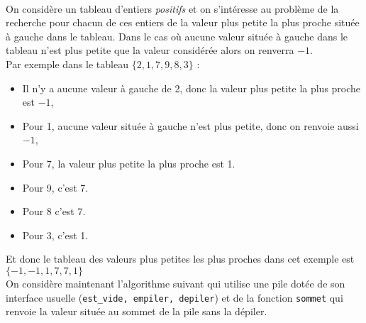 \documentclass[11pt,a4paper]{article}
\begin{document}
\begin{Exercise}[title = {Valeur plus petite la plus proche}]\\
On considère un tableau d'entiers \textit{positifs} et on s'intéresse au problème de la recherche pour chacun de ces entiers de la valeur plus petite la plus proche  située à gauche dans le tableau. Dans le cas où aucune valeur située à gauche dans le tableau n'est plus petite que la valeur considérée alors on  renverra $-1$.\\
Par exemple dans le tableau $\{2, 1, 7, 9, 8, 3\}$ :
\begin{itemize}
	\item Il n'y a aucune valeur à gauche de 2, donc la valeur plus petite la plus proche est $-1$,
	\item Pour 1, aucune valeur située à gauche n'est plus petite, donc on renvoie aussi $-1$,
	\item Pour 7, la valeur plus petite la plus proche est 1.
	\item Pour 9, c'est 7.
	\item Pour 8 c'est 7.
	\item Pour 3, c'est 1.
\end{itemize}
Et donc le tableau des valeurs plus petites les plus proches dans cet exemple est $\{-1, -1, 1, 7, 7, 1\}$
 \medskip \\
On considère maintenant l'algorithme suivant qui utilise une pile dotée de son interface usuelle ({\tt est\_vide, empiler, depiler}) et de la fonction {\tt sommet} qui renvoie la valeur située au sommet de la pile sans la dépiler. \\
\SetAlFnt{\small}

\end{Exercise}
\end{document}
